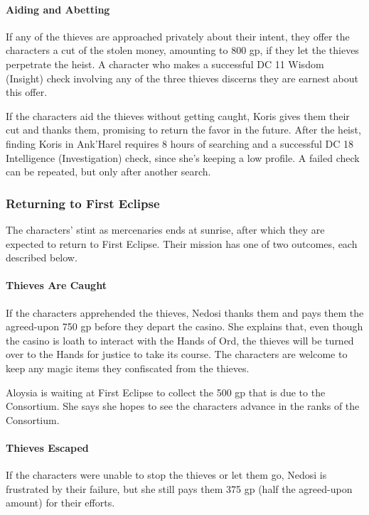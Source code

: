 \documentclass[10pt,a4paper,twoside,twocolumn,openany,nodeprecatedcode]{dndbook}
\begin{document}
\paragraph{Aiding and Abetting}
If any of the thieves are approached privately about their intent, they offer the characters a cut of the stolen money, amounting to 800 gp, if they let the thieves perpetrate the heist. A character who makes a successful DC 11 Wisdom (Insight) check involving any of the three thieves discerns they are earnest about this offer.

If the characters aid the thieves without getting caught, Koris gives them their cut and thanks them, promising to return the favor in the future. After the heist, finding Koris in Ank'Harel requires 8 hours of searching and a successful DC 18 Intelligence (Investigation) check, since she's keeping a low profile. A failed check can be repeated, but only after another search.

\subsubsection{Returning to First Eclipse}
The characters' stint as mercenaries ends at sunrise, after which they are expected to return to First Eclipse. Their mission has one of two outcomes, each described below.

\paragraph{Thieves Are Caught}
If the characters apprehended the thieves, Nedosi thanks them and pays them the agreed-upon 750 gp before they depart the casino. She explains that, even though the casino is loath to interact with the Hands of Ord, the thieves will be turned over to the Hands for justice to take its course. The characters are welcome to keep any magic items they confiscated from the thieves.

Aloysia is waiting at First Eclipse to collect the 500 gp that is due to the Consortium. She says she hopes to see the characters advance in the ranks of the Consortium.

\paragraph{Thieves Escaped}
If the characters were unable to stop the thieves or let them go, Nedosi is frustrated by their failure, but she still pays them 375 gp (half the agreed-upon amount) for their efforts.
\end{document}
